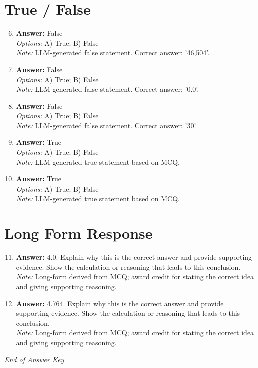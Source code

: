 \documentclass[12pt]{article}
\begin{document}
\section*{True / False}
\begin{enumerate}[label=\arabic*.]
\setcounter{enumi}{5}
\item \textbf{Answer:} False
\\ \textit{Options:} A) True; B) False
\\ \textit{Note:} LLM-generated false statement. Correct answer: '46,504'.
\item \textbf{Answer:} False
\\ \textit{Options:} A) True; B) False
\\ \textit{Note:} LLM-generated false statement. Correct answer: '0.0'.
\item \textbf{Answer:} False
\\ \textit{Options:} A) True; B) False
\\ \textit{Note:} LLM-generated false statement. Correct answer: '30'.
\item \textbf{Answer:} True
\\ \textit{Options:} A) True; B) False
\\ \textit{Note:} LLM-generated true statement based on MCQ.
\item \textbf{Answer:} True
\\ \textit{Options:} A) True; B) False
\\ \textit{Note:} LLM-generated true statement based on MCQ.
\end{enumerate}

\section*{Long Form Response}
\begin{enumerate}[label=\arabic*.]
\setcounter{enumi}{10}
\item \textbf{Answer:} 4.0. Explain why this is the correct answer and provide supporting evidence. Show the calculation or reasoning that leads to this conclusion.
\\ \textit{Note:} Long-form derived from MCQ; award credit for stating the correct idea and giving supporting reasoning.
\item \textbf{Answer:} 4.764. Explain why this is the correct answer and provide supporting evidence. Show the calculation or reasoning that leads to this conclusion.
\\ \textit{Note:} Long-form derived from MCQ; award credit for stating the correct idea and giving supporting reasoning.
\end{enumerate}

\vfill
\noindent\textit{End of Answer Key}
\end{document}
